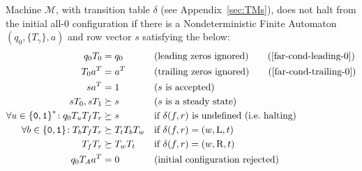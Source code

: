 \begin{theorem}
    \label{far-main-theorem}
    Machine $\mathcal{M}$, with transition table $\delta$ (see Appendix~\ref{sec:TMs}), does not halt from the initial all-0 configuration if there is a Nondeterministic Finite Automaton $(q_0, \{T_\gamma\}, a)$ and row vector $s$ satisfying the below:
    \begin{align}
        \label{far-cond-first}
        q_0 T_0                                    & = q_0
                                                   &                     & \text{(leading zeros ignored)}
        \tag{\ref{far-cond-leading-0}}
        \\
        T_0a\T                                     & = a\T
                                                   &                     & \text{(trailing zeros ignored)}
        \tag{\ref{far-cond-trailing-0}}
        \\
        sa\T                                       & = 1
                                                   &                     & \text{($s$ is accepted)}
        \label{far-cond-ass-accepted}
        \\
        sT_0,sT_1                                  & \succeq s
                                                   &                     & \text{($s$ is a steady state)}
        \label{far-cond-ass-steady}
        \\
        \forall u\in\balphabet^*\!: q_0T_u T_f T_r & \succeq s
                                                   &                     & \text{if $\delta(f,r)$ is undefined (\ie halting)}
        \label{far-cond-halt}
        \\
        \forall b\in\balphabet\!: T_b T_f T_r      & \succeq T_t T_b T_w
                                                   &                     & \text{if $\delta(f,r) = (w,\text{L},t)$}
        \label{far-cond-left}
        \\
        T_f T_r                                    & \succeq T_w T_t
                                                   &                     & \text{if $\delta(f,r) = (w,\text{R},t)$}
        \label{far-cond-last}
        \\
        q_0 T_A a\T                                & = 0
                                                   &                     & \text{(initial configuration rejected)}
        \label{far-cond-reject-start}
    \end{align}
\end{theorem}
